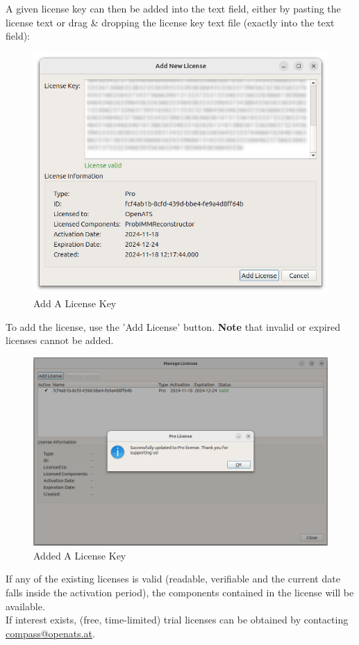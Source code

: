 A given license key can then be added into the text field, either by pasting the license text or drag \& dropping the license key text file (exactly into the text field):

\begin{figure}[H]
    \includegraphics[width=14cm]{figures/configure_license_add2.png}
  \caption{Add A License Key}
\end{figure}

To add the license, use the 'Add License' button. 
\textbf{Note} that invalid or expired licenses cannot be added.

\begin{figure}[H]
    \includegraphics[width=14cm]{figures/configure_license_add3.png}
  \caption{Added A License Key}
\end{figure}

If any of the existing licenses is valid (readable, verifiable and the current date falls inside the activation period), the components contained in the license will be available. \\

If interest exists, (free, time-limited) trial licenses can be obtained by contacting \href{mailto:compass@openats.at}{compass@openats.at}.
